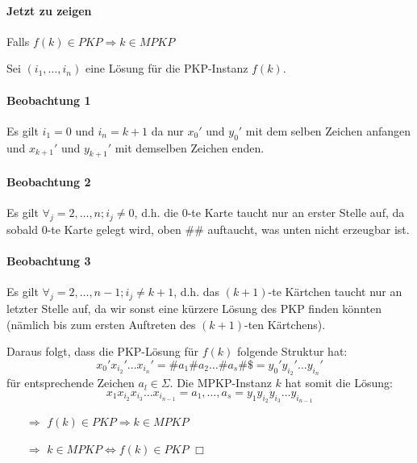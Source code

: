 \paragraph*{Jetzt zu zeigen} Falls $f(k) \in PKP \Rightarrow k \in MPKP$

\para{} Sei $(i_1,\dots,i_n)$ eine Lösung für die PKP-Instanz $f(k)$.

\paragraph*{Beobachtung 1} Es gilt $i_1=0$ und $i_n=k+1$ da nur $x_0'$ und $y_0'$ mit dem selben Zeichen anfangen und $x_{k+1}'$ und $y_{k+1}'$ mit demselben Zeichen enden.

\paragraph*{Beobachtung 2} Es gilt $\forall_j=2,\dots,n; i_j \not=0$, d.h. die 0-te Karte taucht nur an erster Stelle auf, da sobald 0-te Karte gelegt wird, oben \#\# auftaucht, was unten nicht erzeugbar ist.

\paragraph*{Beobachtung 3} Es gilt $\forall_j=2,\dots,n-1; i_j \not= k+1$, d.h. das $(k+1)$-te Kärtchen taucht nur an letzter Stelle auf, da wir sonst eine kürzere Lösung des PKP finden könnten (nämlich bis zum ersten Auftreten des $(k+1)$-ten Kärtchens).

\para{} Daraus folgt, dass die PKP-Lösung für $f(k)$ folgende Struktur hat: $$ x_0'x_{i_2}'\dots x_{i_n}' = \#a_1\#a_2\dots\#a_s\#\$ = y_0'y_{i_2}'\dots y_{i_n}' $$ für entsprechende Zeichen $a_l \in \Sigma$. Die MPKP-Instanz $k$ hat somit die Lösung: $$ x_1x_{i_2}x_{i_3}\dots x_{i_{n-1}} = a_1,\dots,a_s = y_1y_{i_2}y_{i_3}\dots y_{i_{n-1}} $$
\begin{itemize}
	\item[$\Rightarrow$] $f(k) \in PKP \Rightarrow k \in MPKP$
	\item[$\Rightarrow$] $k \in MPKP \Leftrightarrow f(k) \in PKP$ $\Box$
\end{itemize}
